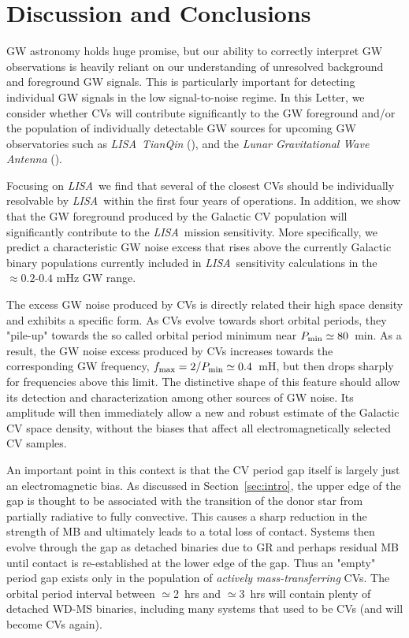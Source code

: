 \documentclass[fleqn,usenatbib]{mnras}
\newcommand{\lisa}{{\it LISA}}
\begin{document}
\section{Discussion and Conclusions} \label{sec:discussion}

GW astronomy holds huge promise, but our ability to correctly interpret GW observations is heavily reliant on our understanding of unresolved background and foreground GW signals. This is particularly important for detecting individual GW signals in the low signal-to-noise regime. In this Letter, we consider whether CVs will contribute significantly to the GW foreground and/or the population of individually detectable GW sources for upcoming GW observatories such as \lisa\,  \textit{TianQin} (\citealt{luo16}), and the \textit{Lunar Gravitational Wave Antenna} (\citealt{harms21}).  

Focusing on \lisa\, we find that several of the closest CVs should be individually resolvable by \lisa\ within the first four years of operations. In addition, we show that the GW foreground produced by the Galactic CV population will significantly contribute to the \lisa\ mission sensitivity. More specifically, we predict a characteristic GW noise excess that rises above the currently Galactic binary populations currently included in \lisa\ sensitivity calculations in the $\approx 0.2$-$0.4$ mHz GW range. 

The excess GW noise produced by CVs is directly related their high space density and exhibits a specific form. As CVs evolve towards short orbital periods, they "pile-up" towards the so called orbital period minimum near $P_{\rm{min}} \simeq 80$~min. As a result, the GW noise excess produced by CVs increases towards the corresponding GW frequency, $f_{\rm{max}} = 2/P_{\rm{min}} \simeq 0.4$~mH, but then drops sharply for frequencies above this limit. The distinctive shape of this feature should allow its detection and characterization among other sources of GW noise. Its amplitude will then immediately allow a new and robust estimate of the Galactic CV space density, without the biases that affect all electromagnetically selected CV samples.

An important point in this context is that the CV period gap itself is largely just an electromagnetic bias. As discussed in Section~\ref{sec:intro}, the upper edge of the gap is thought to be associated with the transition of the donor star from partially radiative to fully convective. This causes a sharp reduction in the strength of MB and ultimately leads to a total loss of contact. Systems then evolve through the gap as detached binaries due to GR and perhaps residual MB until contact is re-established at the lower edge of the gap. Thus an "empty" period gap exists only in the population of {\em actively mass-transferring} CVs. The orbital period interval between $\simeq$2~hrs and $\simeq$3~hrs will contain plenty of detached WD-MS binaries, including many systems that used to be CVs (and will become CVs again). 
\end{document}
